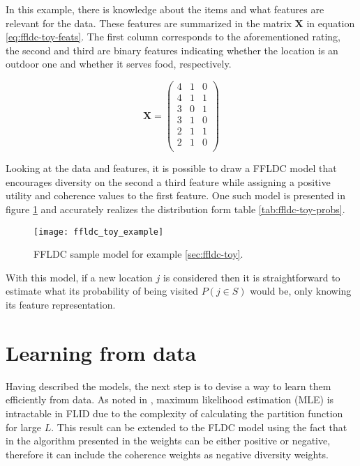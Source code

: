 In this example, there is knowledge about the items and what features are relevant for the data. These features are summarized in the matrix $\mathbf{X}$ in equation \ref{eq:ffldc-toy-feats}. The first column corresponds to the aforementioned rating, the second and third are binary features indicating whether the location is an outdoor one and whether it serves food, respectively.

\begin{equation}
  \mathbf{X} = \left(
    \begin{array}{ccc}
      4 & 1 & 0 \\
      4 & 1 & 1 \\
      3 & 0 & 1 \\
      3 & 1 & 0 \\
      2 & 1 & 1 \\
      2 & 1 & 0  \\
     \end{array}
  \right)
  \label{eq:ffldc-toy-feats}
\end{equation}

Looking at the data and features, it is possible to draw a FFLDC model that encourages diversity on the second a third feature while assigning a positive utility and coherence values to the first feature. One such model is presented in figure \ref{fig:ffldc-toy-all-weights} and accurately realizes the distribution form table \ref{tab:ffldc-toy-probs}.

\begin{figure}
  \centering
  \texttt{[image: ffldc\_toy\_example]}
  \caption{FFLDC sample model for example \ref{sec:ffldc-toy}.}
  \label{fig:ffldc-toy-all-weights}
\end{figure}

With this model, if a new location $j$ is considered then it is straightforward to estimate what its probability of being visited $P(j \in S)$ would be, only knowing its feature representation.

\section{Learning from data}

Having described the models, the next step is to devise a way to learn them efficiently from data. As noted in \cite{tschiatschek16learning}, maximum likelihood estimation (MLE) is intractable in FLID due to the complexity of calculating the partition function for large $L$. This result can be extended to the FLDC model using the fact that in the algorithm presented in \cite{tschiatschek16learning} the weights can be either positive or negative, therefore it can include the coherence weights as negative diversity weights.


